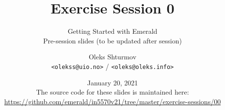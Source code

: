 \documentclass[xcolor=table]{beamer}
\title{{\Large Exercise Session 0}}
\subtitle{Getting Started with Emerald\\Pre-session slides (to be updated after session)}
\institute{{University of Oslo}\\[0.2em] IN[59]570: Distributed Objects}
\author{Oleks Shturmov\\[-0.2em]%
  {\footnotesize \texttt{<olekss@uio.no>} / \texttt{<oleks@oleks.info>}}
}
\date{January 20, 2021\\[2em]
{\scriptsize The source code for these slides is maintained here: \\[-0.5em] {\tiny%
\url{https://github.com/emerald/in5570v21/tree/master/exercise-sessions/00}}%
}}
\begin{document}
\begin{frame} \titlepage \end{frame}




















\end{document}
